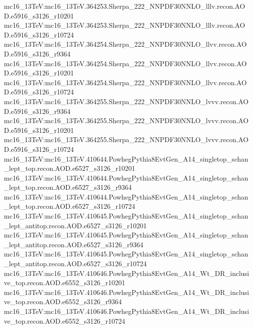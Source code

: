 { mc16\_13TeV:mc16\_13TeV.364253.Sherpa\_222\_NNPDF30NNLO\_lllv.recon.AOD.e5916\_s3126\_r10201\newline    
 mc16\_13TeV:mc16\_13TeV.364253.Sherpa\_222\_NNPDF30NNLO\_lllv.recon.AOD.e5916\_s3126\_r10724\newline    
 mc16\_13TeV:mc16\_13TeV.364254.Sherpa\_222\_NNPDF30NNLO\_llvv.recon.AOD.e5916\_s3126\_r9364\newline    
 mc16\_13TeV:mc16\_13TeV.364254.Sherpa\_222\_NNPDF30NNLO\_llvv.recon.AOD.e5916\_s3126\_r10201\newline    
 mc16\_13TeV:mc16\_13TeV.364254.Sherpa\_222\_NNPDF30NNLO\_llvv.recon.AOD.e5916\_s3126\_r10724\newline    
 mc16\_13TeV:mc16\_13TeV.364255.Sherpa\_222\_NNPDF30NNLO\_lvvv.recon.AOD.e5916\_s3126\_r9364\newline    
 mc16\_13TeV:mc16\_13TeV.364255.Sherpa\_222\_NNPDF30NNLO\_lvvv.recon.AOD.e5916\_s3126\_r10201\newline    
 mc16\_13TeV:mc16\_13TeV.364255.Sherpa\_222\_NNPDF30NNLO\_lvvv.recon.AOD.e5916\_s3126\_r10724\newline    
 mc16\_13TeV:mc16\_13TeV.410644.PowhegPythia8EvtGen\_A14\_singletop\_schan\_lept\_top.recon.AOD.e6527\_s3126\_r10201\newline    
 mc16\_13TeV:mc16\_13TeV.410644.PowhegPythia8EvtGen\_A14\_singletop\_schan\_lept\_top.recon.AOD.e6527\_s3126\_r9364\newline    
 mc16\_13TeV:mc16\_13TeV.410644.PowhegPythia8EvtGen\_A14\_singletop\_schan\_lept\_top.recon.AOD.e6527\_s3126\_r10724\newline    
 mc16\_13TeV:mc16\_13TeV.410645.PowhegPythia8EvtGen\_A14\_singletop\_schan\_lept\_antitop.recon.AOD.e6527\_s3126\_r10201\newline    
 mc16\_13TeV:mc16\_13TeV.410645.PowhegPythia8EvtGen\_A14\_singletop\_schan\_lept\_antitop.recon.AOD.e6527\_s3126\_r9364\newline    
 mc16\_13TeV:mc16\_13TeV.410645.PowhegPythia8EvtGen\_A14\_singletop\_schan\_lept\_antitop.recon.AOD.e6527\_s3126\_r10724\newline   
 mc16\_13TeV:mc16\_13TeV.410646.PowhegPythia8EvtGen\_A14\_Wt\_DR\_inclusive\_top.recon.AOD.e6552\_s3126\_r10201\newline    
 mc16\_13TeV:mc16\_13TeV.410646.PowhegPythia8EvtGen\_A14\_Wt\_DR\_inclusive\_top.recon.AOD.e6552\_s3126\_r9364\newline    
 mc16\_13TeV:mc16\_13TeV.410646.PowhegPythia8EvtGen\_A14\_Wt\_DR\_inclusive\_top.recon.AOD.e6552\_s3126\_r10724\newline    
}
